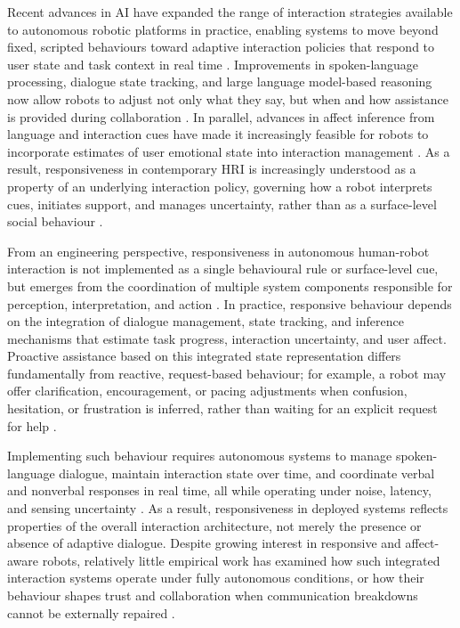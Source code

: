 \documentclass[
]{article}
\begin{document}
Recent advances in AI have expanded the range of interaction strategies
available to autonomous robotic platforms in practice, enabling systems
to move beyond fixed, scripted behaviours toward adaptive interaction
policies that respond to user state and task context in real time
\autocite{atone2022}. Improvements in spoken-language processing,
dialogue state tracking, and large language model-based reasoning now
allow robots to adjust not only what they say, but when and how
assistance is provided during collaboration \autocite{wei}. In parallel,
advances in affect inference from language and interaction cues have
made it increasingly feasible for robots to incorporate estimates of
user emotional state into interaction management
\autocite{mcduff,spitale2023}. As a result, responsiveness in
contemporary HRI is increasingly understood as a property of an
underlying interaction policy, governing how a robot interprets cues,
initiates support, and manages uncertainty, rather than as a
surface-level social behaviour
\autocite{birnbaum2016,shayganfar2019,fartook2025}.

From an engineering perspective, responsiveness in autonomous
human-robot interaction is not implemented as a single behavioural rule
or surface-level cue, but emerges from the coordination of multiple
system components responsible for perception, interpretation, and action
\autocite{arkin2003}. In practice, responsive behaviour depends on the
integration of dialogue management, state tracking, and inference
mechanisms that estimate task progress, interaction uncertainty, and
user affect. Proactive assistance based on this integrated state
representation differs fundamentally from reactive, request-based
behaviour; for example, a robot may offer clarification, encouragement,
or pacing adjustments when confusion, hesitation, or frustration is
inferred, rather than waiting for an explicit request for help
\autocite{birnbaum2016}.

Implementing such behaviour requires autonomous systems to manage
spoken-language dialogue, maintain interaction state over time, and
coordinate verbal and nonverbal responses in real time, all while
operating under noise, latency, and sensing uncertainty
\autocite{campagna2025}. As a result, responsiveness in deployed systems
reflects properties of the overall interaction architecture, not merely
the presence or absence of adaptive dialogue. Despite growing interest
in responsive and affect-aware robots, relatively little empirical work
has examined how such integrated interaction systems operate under fully
autonomous conditions, or how their behaviour shapes trust and
collaboration when communication breakdowns cannot be externally
repaired \autocite{campagna2025}.
\end{document}
